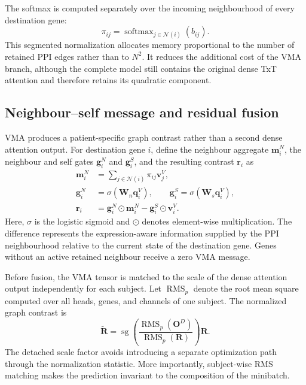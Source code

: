 The softmax is computed separately over the incoming neighbourhood of every destination gene:
\begin{equation}
    \pi_{ij}
    =\operatorname{softmax}_{j\in\mathcal{N}(i)}(b_{ij}).
\end{equation}
This segmented normalization allocates memory proportional to the number of retained PPI edges rather than to \(N^2\). It reduces the additional cost of the VMA branch, although the complete model still contains the original dense TxT attention and therefore retains its quadratic component.

\subsection{Neighbour--self message and residual fusion}

VMA produces a patient-specific graph contrast rather than a second dense attention output. For destination gene \(i\), define the neighbour aggregate \(\mathbf{m}^{N}_i\), the neighbour and self gates \(\mathbf{g}^{N}_i\) and \(\mathbf{g}^{S}_i\), and the resulting contrast \(\mathbf{r}_i\) as
\begin{equation}
\begin{aligned}
    \mathbf{m}^{N}_i
    &=\sum_{j\in\mathcal{N}(i)}\pi_{ij}\mathbf{v}^{V}_j,\\
    \mathbf{g}^{N}_i&=\sigma(\mathbf{W}_n\mathbf{q}^{V}_i),
    \qquad
    \mathbf{g}^{S}_i=\sigma(\mathbf{W}_s\mathbf{q}^{V}_i),\\
    \mathbf{r}_i
    &=\mathbf{g}^{N}_i\odot\mathbf{m}^{N}_i
      -\mathbf{g}^{S}_i\odot\mathbf{v}^{V}_i.
\end{aligned}
\end{equation}
Here, \(\sigma\) is the logistic sigmoid and \(\odot\) denotes element-wise multiplication. The difference represents the expression-aware information supplied by the PPI neighbourhood relative to the current state of the destination gene. Genes without an active retained neighbour receive a zero VMA message.

Before fusion, the VMA tensor is matched to the scale of the dense attention output independently for each subject. Let \(\operatorname{RMS}_p\) denote the root mean square computed over all heads, genes, and channels of one subject. The normalized graph contrast is
\begin{equation}
    \widetilde{\mathbf{R}}
    =
    \operatorname{sg}\!\left(
    \frac{\operatorname{RMS}_p(\mathbf{O}^{D})}
    {\operatorname{RMS}_p(\mathbf{R})}
    \right)\mathbf{R}.
\end{equation}
The detached scale factor avoids introducing a separate optimization path through the normalization statistic. More importantly, subject-wise RMS matching makes the prediction invariant to the composition of the minibatch.

